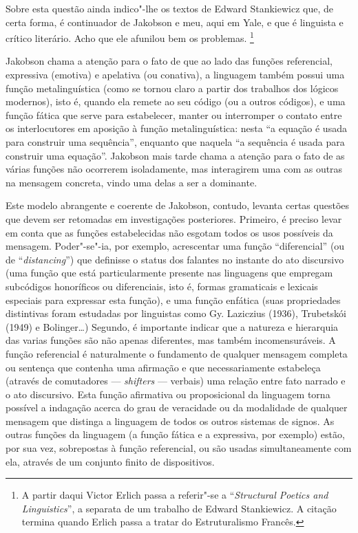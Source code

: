 {Sobre esta questão ainda indico"-lhe os textos de Edward Stankiewicz que,
de certa forma, é continuador de Jakobson e meu, aqui em Yale, e que é
linguista e crítico literário. Acho que ele afunilou bem os problemas.
\footnote{A partir daqui Victor Erlich passa a referir"-se a
  ``\emph{Structural Poetics and Linguistics}'', a separata de um
  trabalho de Edward Stankiewicz. A citação termina quando Erlich passa
  a tratar do Estruturalismo Francês.}

Jakobson chama a atenção para o fato de que ao lado das funções
referencial, expressiva (emotiva) e apelativa (ou conativa), a linguagem
também possui uma função metalinguística (como se tornou claro a partir
dos trabalhos dos lógicos modernos), isto é, quando ela remete ao seu
código (ou a outros códigos), e uma função fática que serve para
estabelecer, manter ou interromper o contato entre os interlocutores em
aposição à função metalinguística: nesta ``a equação é usada para
construir uma sequência'', enquanto que naquela ``a sequência é usada
para construir uma equação''. Jakobson mais tarde chama a atenção para o
fato de as várias funções não ocorrerem isoladamente, mas interagirem
uma com as outras na mensagem concreta, vindo uma delas a ser a
dominante.

Este modelo abrangente e coerente de Jakobson, contudo, levanta certas
questões que devem ser retomadas em investigações posteriores. Primeiro,
é preciso levar em conta que as funções estabelecidas não esgotam todos
os usos possíveis da mensagem. Poder"-se"-ia, por exemplo, acrescentar uma
função ``diferencial'' (ou de ``\emph{distancing}'') que definisse o
status dos falantes no instante do ato discursivo (uma função que está
particularmente presente nas linguagens que empregam subcódigos
honoríficos ou diferenciais, isto é, formas gramaticais e lexicais
especiais para expressar esta função), e uma função enfática (suas
propriedades distintivas foram estudadas por linguistas como Gy.
Laziczius (1936), Trubetskói (1949) e Bolinger\ldots{}) Segundo, é importante
indicar que a natureza e hierarquia das varias funções são não apenas
diferentes, mas também incomensuráveis. A função referencial é
naturalmente o fundamento de qualquer mensagem completa ou sentença que
contenha uma afirmação e que necessariamente estabeleça (através de
comutadores --- \emph{shifters} --- verbais) uma relação entre fato
narrado e o ato discursivo. Esta função afirmativa ou proposicional da
linguagem torna possível a indagação acerca do grau de veracidade ou da
modalidade de qualquer mensagem que distinga a linguagem de todos os
outros sistemas de signos. As outras funções da linguagem (a função
fática e a expressiva, por exemplo) estão, por sua vez, sobrepostas à
função referencial, ou são usadas simultaneamente com ela, através de um
conjunto finito de dispositivos.

}
